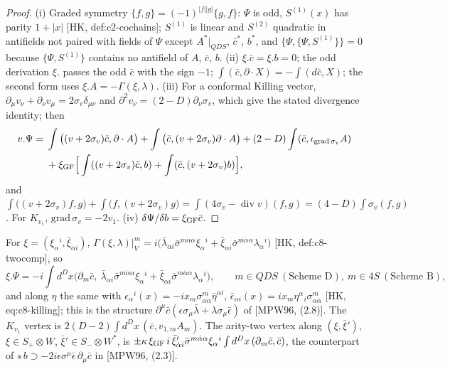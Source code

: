 \begin{proof}
(i) Graded symmetry $\{f,g\}=(-1)^{|f||g|}\{g,f\}$: $\Psi$ is odd, $S^{(1)}(x)$ has parity $1+|x|$ [HK, def:c2-cochains]; $S^{(1)}$ is linear and $S^{(2)}$ quadratic in antifields not paired with fields of $\Psi$ except $A^*|_{QDS}$, $\bar c^*$, $b^*$, and $\{\Psi,\{\Psi,S^{(1)}\}\}=0$ because $\{\Psi,S^{(1)}\}$ contains no antifield of $A$, $\bar c$, $b$. (ii) $\xi.\bar c=\xi.b=0$; the odd derivation $\xi.$ passes the odd $\bar c$ with the sign $-1$; $\int(\bar c,\partial\cdot X)=-\int(d\bar c,X)$; the second form uses $\xi.A=-\Gamma(\xi,\lambda)$. (iii) For a conformal Killing vector, $\partial_\mu v_\nu+\partial_\nu v_\mu=2\sigma_v\delta_{\mu\nu}$ and $\partial^2v_\nu=(2-D)\partial_\nu\sigma_v$, which give the stated divergence identity; then
\[
\begin{aligned}
v.\Psi={}&\int\big((v+2\sigma_v)\bar c,\partial\cdot A\big)+\int\big(\bar c,(v+2\sigma_v)\partial\cdot A\big)+(2-D)\int(\bar c,\iota_{\mathrm{grad}\,\sigma_v}A)\\
&+\xi_{\rm GF}\Big[\int((v+2\sigma_v)\bar c,b)+\int(\bar c,(v+2\sigma_v)b)\Big],
\end{aligned}
\]
and $\int\big((v+2\sigma_v)f,g\big)+\int\big(f,(v+2\sigma_v)g\big)=\int(4\sigma_v-\operatorname{div}v)(f,g)=(4-D)\int\sigma_v(f,g)$. For $K_{v_1}$, $\mathrm{grad}\,\sigma_v=-2v_1$. (iv) $\delta\Psi/\delta b=\xi_{\rm GF}\bar c$.
\end{proof}

\begin{remark}
For $\xi=(\xi_\alpha{}^i,\bar\xi_{\dot\alpha i})$, $\Gamma(\xi,\lambda)|_V^m=i\big(\bar\lambda_{\dot\alpha i}\bar\sigma^{m\dot\alpha\alpha}\xi_\alpha{}^i+\bar\xi_{\dot\alpha i}\bar\sigma^{m\dot\alpha\alpha}\lambda_\alpha{}^i\big)$ [HK, def:c8-twocomp], so
\[
\xi.\Psi=-i\int d^Dx\Big(\partial_m\bar c,\ \bar\lambda_{\dot\alpha i}\bar\sigma^{m\dot\alpha\alpha}\xi_\alpha{}^i+\bar\xi_{\dot\alpha i}\bar\sigma^{m\dot\alpha\alpha}\lambda_\alpha{}^i\Big),\qquad m\in QDS\ (\text{Scheme D}),\ m\in4S\ (\text{Scheme B}),
\]
and along $\eta$ the same with $\epsilon_\alpha{}^i(x)=-ix_m\sigma^m_{\alpha\dot\alpha}\bar\eta^{\dot\alpha i}$, $\bar\epsilon_{\dot\alpha i}(x)=ix_m\eta^\alpha{}_i\sigma^m_{\alpha\dot\alpha}$ [HK, eq:c8-killing]; this is the structure $\partial^\mu\bar c(\epsilon\sigma_\mu\bar\lambda+\lambda\sigma_\mu\bar\epsilon)$ of [MPW96, (2.8)]. The $K_{v_1}$ vertex is $2(D-2)\int d^Dx\,(\bar c,v_{1,m}A_m)$. The arity-two vertex along $(\xi,\bar\xi')$, $\xi\in S_+\otimes W$, $\bar\xi'\in S_-\otimes W^*$, is $\pm\kappa\,\xi_{\rm GF}\,i\,\bar\xi'_{\dot\alpha i}\bar\sigma^{m\dot\alpha\alpha}\xi_\alpha{}^i\int d^Dx\,(\partial_m\bar c,\bar c)$, the counterpart of $s\,b\supset-2i\epsilon\sigma^\mu\bar\epsilon\,\partial_\mu\bar c$ in [MPW96, (2.3)].
\end{remark}

